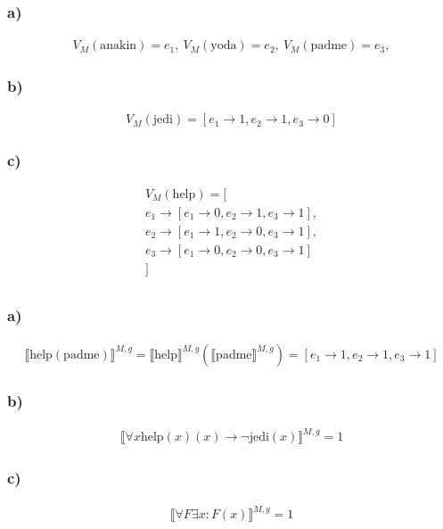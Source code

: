 \documentclass{article}
\renewcommand\t[1]{\text{#1}}
\begin{document}
\subsubsection*{a)}

\begin{gather*}
V_M(\t{anakin}) = e_1,\ 
V_M(\t{yoda}) = e_2,\ 
V_M(\t{padme}) = e_3, 
\end{gather*}


\subsubsection*{b)}

\begin{gather*}
V_M(\t{jedi}) = [e_1 \rightarrow 1, e_2 \rightarrow 1, e_3 \rightarrow 0]
\end{gather*}


\subsubsection*{c)}

\begin{gather*}
V_M(\t{help}) = [\\
e_1 \rightarrow [e_1 \rightarrow 0, e_2 \rightarrow 1, e_3 \rightarrow 1],\\
e_2 \rightarrow [e_1 \rightarrow 1, e_2 \rightarrow 0, e_3 \rightarrow 1],\\
e_3 \rightarrow [e_1 \rightarrow 0, e_2 \rightarrow 0, e_3 \rightarrow 1]\\
]
\end{gather*}

\subsection{}

\subsubsection*{a)}

\begin{gather*}
\llbracket\t{help}(\t{padme})\rrbracket^{M,g} = \llbracket\t{help}\rrbracket^{M,g}(\llbracket\t{padme}\rrbracket^{M,g}) =
[e_1 \rightarrow 1, e_2 \rightarrow 1, e_3 \rightarrow 1]
\end{gather*}

\subsubsection*{b)}

\begin{gather*}
\llbracket\forall x \t{help}(x)(x) \rightarrow \neg \t{jedi}(x)\rrbracket^{M,g} = 1
\end{gather*}

\subsubsection*{c)}

\begin{gather*}
\llbracket\forall F \exists x: F(x)\rrbracket^{M,g} = 1
\end{gather*}
\end{document}
